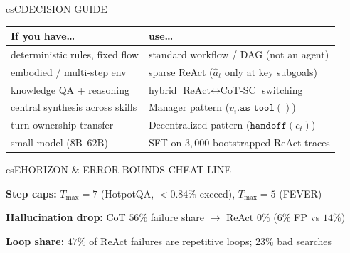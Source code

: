 \documentclass[../../../../master.tex]{subfiles}
\begin{document}
\begin{cscolumns}
\begin{cscard}{csC}{DECISION GUIDE}
  \renewcommand{\arraystretch}{1.15}\small
  \begin{tabular}{@{}>{\raggedright\arraybackslash}p{3.1cm}>{\raggedright\arraybackslash}p{4.7cm}@{}}
    \textbf{If you have\ldots} & \textbf{use\ldots}\\ \hline
    deterministic rules, fixed flow & standard workflow / DAG (not an agent)\\
    embodied / multi-step env & sparse ReAct ($\hat{a}_t$ only at key subgoals)\\
    knowledge QA + reasoning & hybrid $\text{ReAct}\leftrightarrow\text{CoT-SC}$ switching\\
    central synthesis across skills & Manager pattern ($v_i.\texttt{as\_tool}()$)\\
    turn ownership transfer & Decentralized pattern ($\texttt{handoff}(c_t)$)\\
    small model ($8\text{B}\text{--}62\text{B}$) & SFT on $3{,}000$ bootstrapped ReAct traces\\
  \end{tabular}
\end{cscard}

\begin{cscard}{csE}{HORIZON \& ERROR BOUNDS CHEAT-LINE}
  \begin{csbul}
    \item \textbf{Step caps:} $T_{\max}=7$ (HotpotQA, $<0.84\%$ exceed), $T_{\max}=5$ (FEVER)
    \item \textbf{Hallucination drop:} CoT $56\%$ failure share $\to$ ReAct $0\%$ ($6\%$ FP vs $14\%$)
    \item \textbf{Loop share:} $47\%$ of ReAct failures are repetitive loops; $23\%$ bad searches
  \end{csbul}
\end{cscard}


\end{cscolumns}
\end{document}
